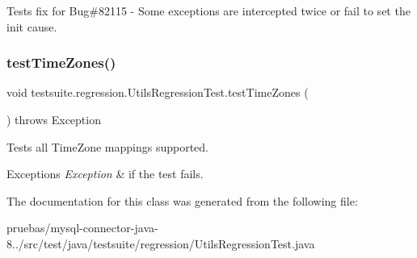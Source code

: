 Tests fix for Bug\#82115 -\/ Some exceptions are intercepted twice or fail to set the init cause. \mbox{\label{classtestsuite_1_1regression_1_1_utils_regression_test_a23afa0e1c5288ab757fb3e4c09676f79}} 
\subsubsection{\texorpdfstring{test\+Time\+Zones()}{testTimeZones()}}
{\footnotesize\ttfamily void testsuite.\+regression.\+Utils\+Regression\+Test.\+test\+Time\+Zones (\begin{DoxyParamCaption}{ }\end{DoxyParamCaption}) throws Exception}

Tests all Time\+Zone mappings supported.


\begin{DoxyExceptions}{Exceptions}
{\em Exception} & if the test fails. \\
\hline
\end{DoxyExceptions}


The documentation for this class was generated from the following file\+:\begin{DoxyCompactItemize}
\item 
pruebas/mysql-\/connector-\/java-\/8../src/test/java/testsuite/regression/Utils\+Regression\+Test.\+java\end{DoxyCompactItemize}

